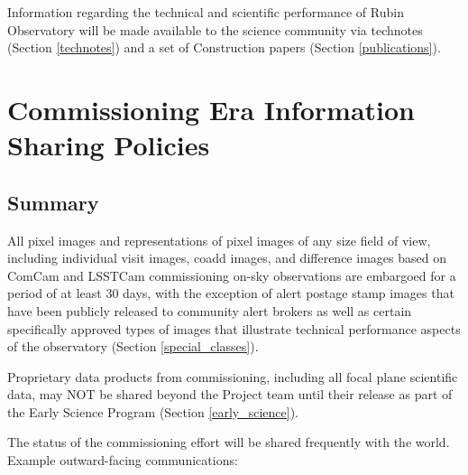 \documentclass[SE,authoryear,toc]{lsstdoc}
\begin{document}
Information regarding the technical and scientific performance of Rubin Observatory will be made available to the science community via technotes (Section \ref{technotes}) and a set of Construction papers (Section \ref{publications}).

\section{Commissioning Era Information Sharing Policies}
\label{policy}

\subsection{Summary}

All pixel images and representations of pixel images of any size field of view, including individual visit images, coadd images, and difference images based on ComCam and LSSTCam commissioning on-sky observations are embargoed for a period of at least 30 days, with the exception of alert postage stamp images that have been publicly released to community alert brokers as well as certain specifically approved types of images that illustrate technical performance aspects of the observatory (Section \ref{special_classes}).

Proprietary data products from commissioning, including all focal plane scientific data, may NOT be shared beyond the Project team until their release as part of the Early Science Program (Section \ref{early_science}).

The status of the commissioning effort will be shared frequently with the world.
Example outward-facing communications:
\end{document}
